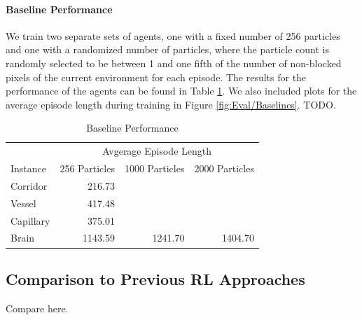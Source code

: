 \paragraph{Baseline Performance}
We train two separate sets of agents, one with a fixed number of 256 particles and one with a randomized number of particles, where the particle count is randomly selected to be between 1 and one fifth of the number of non-blocked pixels of the current environment for each episode. The results for the performance of the agents can be found in Table \ref{tab:Eval/BaselinePerformance}. We also included plots for the average episode length during training in Figure \ref{fig:Eval/Baselines}. TODO.

\begin{table} [htp]
    \begin{center}
        \begin{tabular}{lrrr}
            \toprule
            & \multicolumn{3}{c}{Avgerage Episode Length} \\
            \cmidrule(lr){2-4}
            Instance & 256 Particles & 1000 Particles & 2000 Particles \\
            \midrule
            Corridor & 216.73 & &  \\
            Vessel & 417.48 & & \\
            Capillary & 375.01 & & \\
            Brain & 1143.59 & 1241.70 & 1404.70 \\
            \bottomrule
        \end{tabular}

    \end{center}
    \caption{Baseline Performance} \label{tab:Eval/BaselinePerformance}
\end{table}


\subsection{Comparison to Previous RL Approaches} \label{sec:EvalRLComparison}
Compare here.

